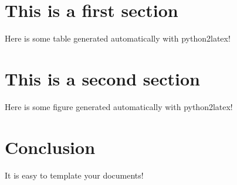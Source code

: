 \documentclass[12pt]{article}
\begin{document}
\section{This is a first section}

Here is some table generated automatically with python2latex!


\section{This is a second section}

Here is some figure generated automatically with python2latex!


\section{Conclusion}
It is easy to template your documents!
\end{document}
